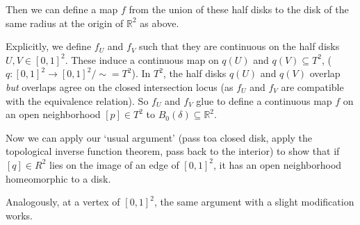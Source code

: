 \documentclass[a4paper]{scrartcl}
\begin{document}
\begin{example}
\begin{center}
        

    \end{center}

Then we can define a map $f$ from the union of these half disks to the disk of the same radius at the origin of $\mathbb{R}^2$ as above. 

Explicitly, we define $f_U$ and $f_V$ such that they are continuous on the half disks $U, V \in [0, 1]^2$. These induce a continuous map on $q(U)$ and $q(V) \subseteq T^2$, ($q: [0, 1]^2 \rightarrow [0, 1]^2/\sim = T^2$). In $T^2$, the half disks $q(U)$ and $q(V)$ overlap \emph{but} overlaps agree on the closed intersection locus (as $f_U$ and $f_V$ are compatible with the equivalence relation). So $f_U$ and $f_V$ glue to define a continuous map $f$ on an open neighborhood $[p] \in T^2$ to $B_0(\delta) \subseteq \mathbb{R}^2$.

Now we can apply our `usual argument' (pass toa closed disk, apply the topological inverse function theorem, pass back to the interior) to show that if $[q] \in R^2$ lies on the image of an edge of $[0, 1]^2$, it has an open neighborhood homeomorphic to a disk.

Analogously, at a vertex of $[0, 1]^2$, the same argument with a slight modification works.
\begin{center}
    


\begin{tikzpicture}[x=0.75pt,y=0.75pt,yscale=-1,xscale=1]


\end{tikzpicture}
\end{center}
\end{example}
\end{document}
